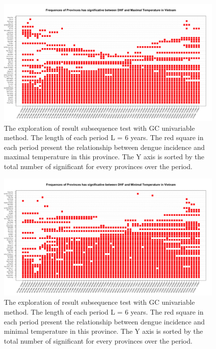 \begin{figure}[h]
\begin{center}
\includegraphics[width = \linewidth]{../figures/annexe/result_tx.png}
\caption{The exploration of result subsequence test with GC univariable method. The length of each period L = 6 years. The red square in each period present the relationship between dengue incidence and maximal temperature in this province. The Y axis is sorted by the total number of significant for every provinces over the period. }
\label{expl_2}	
\end{center}
\end{figure}

\begin{figure}[h]
\begin{center}
\includegraphics[width = \linewidth]{../figures/annexe/result_tm.png}
\caption{The exploration of result subsequence test with GC univariable method. The length of each period L = 6 years. The red square in each period present the relationship between dengue incidence and minimal temperature in this province. The Y axis is sorted by the total number of significant for every provinces over the period. }
\label{expl_3}	
\end{center}
\end{figure}

